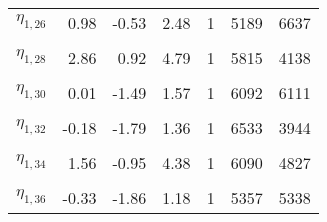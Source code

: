 \begin{table}
\begin{tabular}[t]{lrrrrrr}
$\eta_{1, 26}$ & 0.98 & -0.53 & 2.48 & 1 & 5189 & 6637\\
\cellcolor{gray!6}{$\eta_{1, 27}$} & \cellcolor{gray!6}{0.86} & \cellcolor{gray!6}{-0.51} & \cellcolor{gray!6}{2.30} & \cellcolor{gray!6}{1} & \cellcolor{gray!6}{5809} & \cellcolor{gray!6}{4556}\\
$\eta_{1, 28}$ & 2.86 & 0.92 & 4.79 & 1 & 5815 & 4138\\
\cellcolor{gray!6}{$\eta_{1, 29}$} & \cellcolor{gray!6}{-0.46} & \cellcolor{gray!6}{-1.79} & \cellcolor{gray!6}{0.82} & \cellcolor{gray!6}{1} & \cellcolor{gray!6}{5730} & \cellcolor{gray!6}{4600}\\
$\eta_{1, 30}$ & 0.01 & -1.49 & 1.57 & 1 & 6092 & 6111\\
\cellcolor{gray!6}{$\eta_{1, 31}$} & \cellcolor{gray!6}{1.11} & \cellcolor{gray!6}{-1.02} & \cellcolor{gray!6}{3.40} & \cellcolor{gray!6}{1} & \cellcolor{gray!6}{5489} & \cellcolor{gray!6}{4717}\\
$\eta_{1, 32}$ & -0.18 & -1.79 & 1.36 & 1 & 6533 & 3944\\
\cellcolor{gray!6}{$\eta_{1, 33}$} & \cellcolor{gray!6}{2.82} & \cellcolor{gray!6}{0.09} & \cellcolor{gray!6}{6.07} & \cellcolor{gray!6}{1} & \cellcolor{gray!6}{6086} & \cellcolor{gray!6}{5348}\\
$\eta_{1, 34}$ & 1.56 & -0.95 & 4.38 & 1 & 6090 & 4827\\
\cellcolor{gray!6}{$\eta_{1, 35}$} & \cellcolor{gray!6}{0.72} & \cellcolor{gray!6}{-0.88} & \cellcolor{gray!6}{2.39} & \cellcolor{gray!6}{1} & \cellcolor{gray!6}{5587} & \cellcolor{gray!6}{5249}\\
$\eta_{1, 36}$ & -0.33 & -1.86 & 1.18 & 1 & 5357 & 5338\\
\bottomrule
\end{tabular}
\end{table}